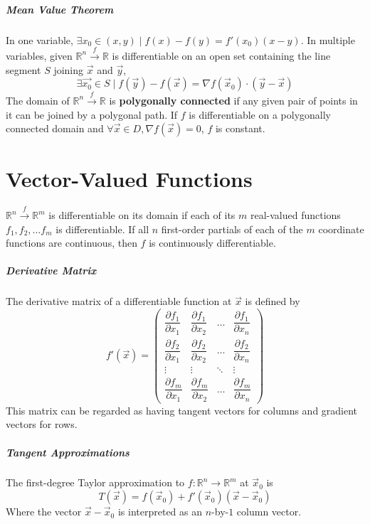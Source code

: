 \documentclass[11pt]{article}
\begin{document}
	\subparagraph{Mean Value Theorem} In one variable, $\exists x_0 \in (x, y) \mid f(x) - f(y) = f'(x_0)(x - y)$. In multiple variables, given $\mathbb{R}^n \xrightarrow{f} \mathbb{R}$ is differentiable on an open set containing the line segment $S$ joining $\vec{x}$ and $\vec{y}$,
	\begin{equation}
		\exists \vec{x_0} \in S \mid f(\vec{y}) - f(\vec{x}) = \nabla f(\vec{x}_0) \cdot (\vec{y} - \vec{x})
	\end{equation}
	The domain of $\mathbb{R}^n \xrightarrow{f} \mathbb{R}$ is \textbf{polygonally connected} if any given pair of points in it can be joined by a polygonal path. If $f$ is differentiable on a polygonally connected domain and $\forall \vec{x} \in D, \nabla f(\vec{x}) = 0$, $f$ is constant.
	
\section{Vector-Valued Functions}
	$\mathbb{R}^n \xrightarrow{f} \mathbb{R}^m$ is differentiable on its domain if each of its $m$ real-valued functions $f_1, f_2, \ldots f_m$ is differentiable. If all $n$ first-order partials of each of the $m$ coordinate functions are continuous, then $f$ is continuously differentiable. 
	
	\subparagraph{Derivative Matrix} The derivative matrix of a differentiable function at $\vec{x}$ is defined by 
		\begin{equation}
			f'(\vec{x}) = 
			\begin{pmatrix}
				\dfrac{\partial f_1}{\partial x_1} & \dfrac{\partial f_1}{\partial x_2} & \ldots & \dfrac{\partial f_1}{\partial x_n}\\
				\dfrac{\partial f_2}{\partial x_1} & \dfrac{\partial f_2}{\partial x_2} & \ldots & \dfrac{\partial f_2}{\partial x_n}\\
				\vdots & \vdots & \ddots & \vdots \\
				\dfrac{\partial f_m}{\partial x_1} & \dfrac{\partial f_m}{\partial x_2} & \ldots & \dfrac{\partial f_m}{\partial x_n}
			\end{pmatrix}
		\end{equation}
		This matrix can be regarded as having tangent vectors for columns and gradient vectors for rows.
		
	\subparagraph{Tangent Approximations} The first-degree Taylor approximation to $f: \mathbb{R}^n \rightarrow \mathbb{R}^m$ at $\vec{x}_0$ is
		\begin{equation}
			T(\vec{x}) = f(\vec{x}_0) + f'(\vec{x}_0)(\vec{x}-\vec{x}_0)
		\end{equation}
		Where the vector $\vec{x}-\vec{x}_0$ is interpreted as an $n$-by-$1$ column vector. 
		
\end{document}

